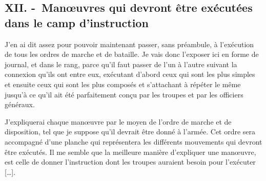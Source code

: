 \documentclass[french,twoside]{book} %
\begin{document}
\subsection[{XII. - Manœuvres qui devront être exécutées dans le camp d’instruction}]{XII. - Manœuvres qui devront être exécutées dans le camp d’instruction}
\noindent J’en ai dit assez pour pouvoir maintenant passer, sans préambule, à l’exécution de tous les ordres de marche et de bataille. Je vais donc l’exposer ici en forme de journal, et dans le rang, parce qu’il faut passer de l’un à l’autre suivant la connexion qu’ils ont entre eux, exécutant d’abord ceux qui sont les plus simples et ensuite ceux qui sont les plus composés et s’attachant à répéter le même jusqu’à ce qu’il ait été parfaitement conçu par les troupes et par les officiers généraux.\par
J’expliquerai chaque manœuvre par le moyen de l’ordre de marche et de disposition, tel que je suppose qu’il devrait être donné à l’armée. Cet ordre sera accompagné d’une planche qui représentera les différents mouvements qui devront être exécutés. Il me semble que la meilleure manière d’expliquer une manœuvre, est celle de donner l’instruction dont les troupes auraient besoin pour l’exécuter […].
\end{document}
